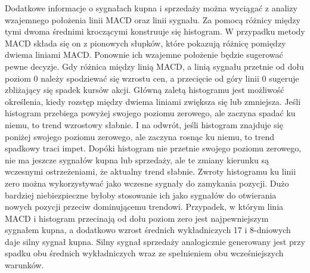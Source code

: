 \documentclass[pdflatex,11pt]{aghdpl}
\begin{document}
Dodatkowe informacje o sygnałach kupna i sprzedaży można wyciągać z analizy wzajemnego położenia linii MACD oraz linii sygnału. Za pomocą różnicy między tymi dwoma średnimi kroczącymi konstruuje się histogram. W przypadku metody MACD składa się on z pionowych słupków, które pokazują różnicę pomiędzy dwiema liniami MACD. Ponownie ich wzajemne położenie będzie sugerować pewne decyzje. Gdy różnica między linią MACD, a linią sygnału przetnie od dołu poziom 0 należy spodziewać się wzrostu cen, a przecięcie od góry linii 0 sugeruje zbliżający się spadek kursów akcji. Główną zaletą histogramu jest możliwość określenia, kiedy rozstęp między dwiema liniami zwiększa się lub zmniejsza. Jeśli histogram przebiega powyżej swojego poziomu zerowego, ale zaczyna spadać ku niemu, to trend wzrostowy słabnie. I na odwrót, jeśli histogram znajduje się poniżej swojego poziomu zerowego, ale zaczyna rosnąc ku niemu, to trend spadkowy traci impet. Dopóki histogram nie przetnie swojego poziomu zerowego, nie ma jeszcze sygnałów kupna lub sprzedaży, ale te zmiany kierunku są wczesnymi ostrzeżeniami, że aktualny trend słabnie. Zwroty histogramu ku linii zero można wykorzystywać jako wczesne sygnały do zamykania pozycji. Dużo bardziej niebiezpieczne byłoby stosowanie ich jako sygnałów do otwierania nowych pozycji przeciw dominującemu trendowi. Przypadek, w którym linia MACD i histogram przecinają od dołu poziom zero jest najpewniejszym sygnałem kupna, a dodatkowo wzrost średnich wykładniczych 17 i 8-dniowych daje silny sygnał kupna\cite{1}. Silny sygnał sprzedaży analogicznie generowany jest przy spadku obu średnich wykładniczych wraz ze spełnieniem obu wcześniejszych warunków. 
\end{document}
